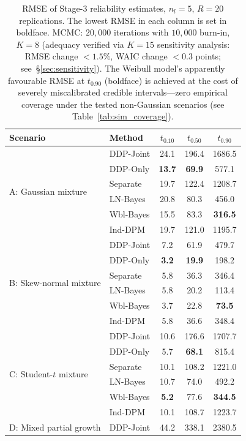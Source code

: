 \documentclass[a4paper,fleqn,longmktitle]{cas-sc}
\begin{document}
\begin{table}
\centering
\caption{RMSE of Stage-3 reliability estimates, $n_l = 5$, $R = 20$ replications. The lowest RMSE in each column is set in boldface. MCMC: $20{,}000$ iterations with $10{,}000$ burn-in, $K=8$ (adequacy verified via $K=15$ sensitivity analysis: RMSE change $< 1.5\%$, WAIC change $< 0.3$ points; see~\S\ref{sec:sensitivity}). The Weibull model's apparently favourable RMSE at $t_{0.90}$ (boldface) is achieved at the cost of severely miscalibrated credible intervals---zero empirical coverage under the tested non-Gaussian scenarios (see Table~\ref{tab:sim_coverage}).}
\label{tab:sim_rmse}
\begin{tabular}{llccc}
\toprule
Scenario & Method & $t_{0.10}$ & $t_{0.50}$ & $t_{0.90}$ \\
\midrule
\multirow{6}{*}{A: Gaussian mixture}
    & DDP-Joint & 24.1 & 196.4 & 1686.5 \\
    & DDP-Only  & \textbf{13.7} & \textbf{69.9} & 577.1 \\
    & Separate  & 19.7 & 122.4 & 1208.7 \\
    & LN-Bayes  & 20.8 & 80.3 & 456.0 \\
    & Wbl-Bayes & 15.5 & 83.3 & \textbf{316.5} \\
    & Ind-DPM   & 19.7 & 121.0 & 1195.7 \\
\midrule
\multirow{6}{*}{B: Skew-normal mixture}
    & DDP-Joint & 7.2 & 61.9 & 479.7 \\
    & DDP-Only  & \textbf{3.2} & \textbf{19.9} & 198.2 \\
    & Separate  & 5.8 & 36.3 & 346.4 \\
    & LN-Bayes  & 5.8 & 20.2 & 113.4 \\
    & Wbl-Bayes & 3.7 & 22.8 & \textbf{73.5} \\
    & Ind-DPM   & 5.8 & 36.6 & 348.4 \\
\midrule
\multirow{6}{*}{C: Student-$t$ mixture}
    & DDP-Joint & 10.6 & 176.6 & 1707.7 \\
    & DDP-Only  & 5.7 & \textbf{68.1} & 815.4 \\
    & Separate  & 10.1 & 108.2 & 1221.0 \\
    & LN-Bayes  & 10.7 & 74.0 & 492.2 \\
    & Wbl-Bayes & \textbf{5.2} & 77.6 & \textbf{344.5} \\
    & Ind-DPM   & 10.1 & 108.7 & 1223.7 \\
\midrule
\multirow{6}{*}{D: Mixed partial growth}
    & DDP-Joint & 44.2 & 338.1 & 2380.5 \\

\end{tabular}
\end{table}
\end{document}
